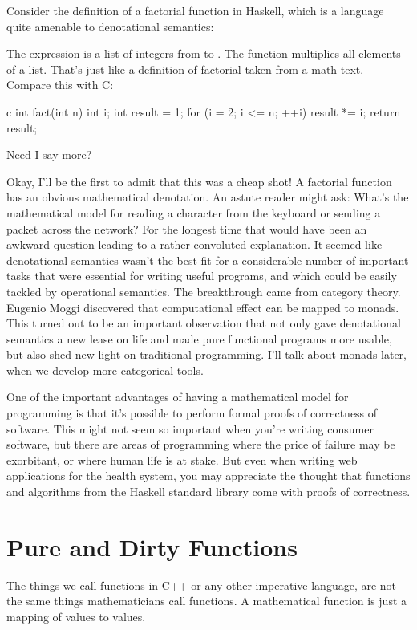 Consider the definition of a factorial function in Haskell, which is a
language quite amenable to denotational semantics:

The expression \code{{[}1..n{]}} is a list of integers from  to .
The function  multiplies all elements of a list. That's
just like a definition of factorial taken from a math text. Compare this
with C:

\begin{snip}{c}
int fact(int n) {
    int i;
    int result = 1;
    for (i = 2; i <= n; ++i)
        result *= i;
    return result;
}
\end{snip}
Need I say more?

Okay, I'll be the first to admit that this was a cheap shot! A factorial
function has an obvious mathematical denotation. An astute reader might
ask: What's the mathematical model for reading a character from the
keyboard or sending a packet across the network? For the longest time
that would have been an awkward question leading to a rather convoluted
explanation. It seemed like denotational semantics wasn't the best fit
for a considerable number of important tasks that were essential for
writing useful programs, and which could be easily tackled by
operational semantics. The breakthrough came from category theory.
Eugenio Moggi discovered that computational effect can be mapped to
monads. This turned out to be an important observation that not only
gave denotational semantics a new lease on life and made pure functional
programs more usable, but also shed new light on traditional
programming. I'll talk about monads later, when we develop more
categorical tools.

One of the important advantages of having a mathematical model for
programming is that it's possible to perform formal proofs of
correctness of software. This might not seem so important when you're
writing consumer software, but there are areas of programming where the
price of failure may be exorbitant, or where human life is at stake. But
even when writing web applications for the health system, you may
appreciate the thought that functions and algorithms from the Haskell
standard library come with proofs of correctness.

\section{Pure and Dirty Functions}

The things we call functions in C++ or any other imperative language,
are not the same things mathematicians call functions. A mathematical
function is just a mapping of values to values.

